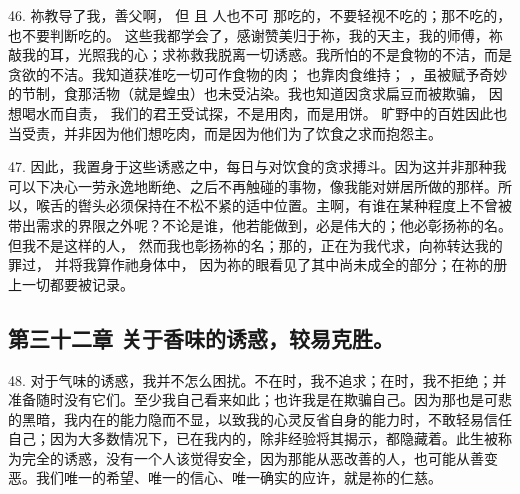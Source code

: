 46. 祢教导了我，善父啊， 但  且 人也不可 那吃的，不要轻视不吃的；那不吃的，也不要判断吃的。 这些我都学会了，感谢赞美归于祢，我的天主，我的师傅，祢敲我的耳，光照我的心；求祢救我脱离一切诱惑。我所怕的不是食物的不洁，而是贪欲的不洁。我知道获准吃一切可作食物的肉； 也靠肉食维持； ，虽被赋予奇妙的节制，食那活物（就是蝗虫）也未受沾染。我也知道因贪求扁豆而被欺骗， 因想喝水而自责， 我们的君王受试探，不是用肉，而是用饼。 旷野中的百姓因此也当受责，并非因为他们想吃肉，而是因为他们为了饮食之求而抱怨主。\par

47. 因此，我置身于这些诱惑之中，每日与对饮食的贪求搏斗。因为这并非那种我可以下决心一劳永逸地断绝、之后不再触碰的事物，像我能对姘居所做的那样。所以，喉舌的辔头必须保持在不松不紧的适中位置。主啊，有谁在某种程度上不曾被带出需求的界限之外呢？不论是谁，他若能做到，必是伟大的；他必彰扬祢的名。但我不是这样的人， 然而我也彰扬祢的名；那的，正在为我代求，向祢转达我的罪过， 并将我算作祂身体中， 因为祢的眼看见了其中尚未成全的部分；在祢的册上一切都要被记录。\par


\subsection{第三十二章 关于香味的诱惑，较易克胜。}

48. 对于气味的诱惑，我并不怎么困扰。不在时，我不追求；在时，我不拒绝；并准备随时没有它们。至少我自己看来如此；也许我是在欺骗自己。因为那也是可悲的黑暗，我内在的能力隐而不显，以致我的心灵反省自身的能力时，不敢轻易信任自己；因为大多数情况下，已在我内的，除非经验将其揭示，都隐藏着。此生被称为完全的诱惑，没有一个人该觉得安全，因为那能从恶改善的人，也可能从善变恶。我们唯一的希望、唯一的信心、唯一确实的应许，就是祢的仁慈。\par

